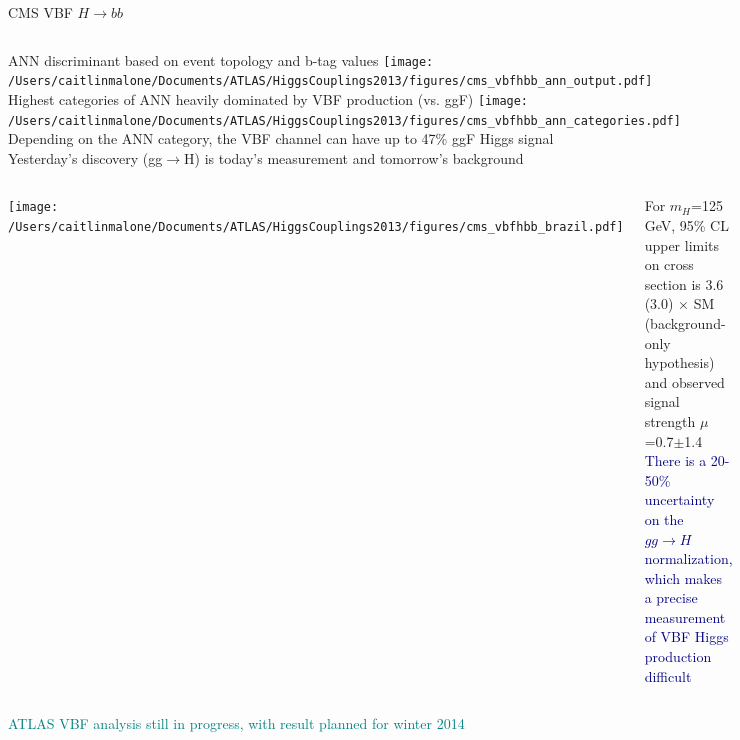\documentclass{beamer}
\begin{document}
\begin{frame}{CMS VBF $H\rightarrow bb$}	
	\begin{columns}[c]
			\scriptsize ANN discriminant based on event topology and b-tag values
			\texttt{[image: /Users/caitlinmalone/Documents/ATLAS/HiggsCouplings2013/figures/cms\_vbfhbb\_ann\_output.pdf]}
			\scriptsize Highest categories of ANN heavily dominated by VBF production (vs. ggF)
			\texttt{[image: /Users/caitlinmalone/Documents/ATLAS/HiggsCouplings2013/figures/cms\_vbfhbb\_ann\_categories.pdf]}
			\scriptsize Depending on the ANN category, the VBF channel can have up to 47\% ggF Higgs signal \\
			\textcolor{BrickRed}{Yesterday's discovery (gg$\rightarrow$H) is today's measurement and tomorrow's background}
	\end{columns}
	\begin{columns}[c]
		\column{0.5\textwidth}
			\texttt{[image: /Users/caitlinmalone/Documents/ATLAS/HiggsCouplings2013/figures/cms\_vbfhbb\_brazil.pdf]}
		\column{0.5\textwidth}
		\scriptsize 

		For $m_H$=125 GeV, 95\% CL upper limits on cross section is 3.6 (3.0) $\times$ SM (background-only hypothesis) and observed signal strength $\mu$=0.7$\pm$1.4 \\
		\textcolor{Navy}{There is a 20-50\% uncertainty on the $gg\rightarrow H$ normalization, which makes a precise measurement of VBF Higgs production difficult}
	\end{columns}
	\scriptsize\textcolor{Teal}{ATLAS VBF analysis still in progress, with result planned for winter 2014}
\end{frame}
\end{document}

